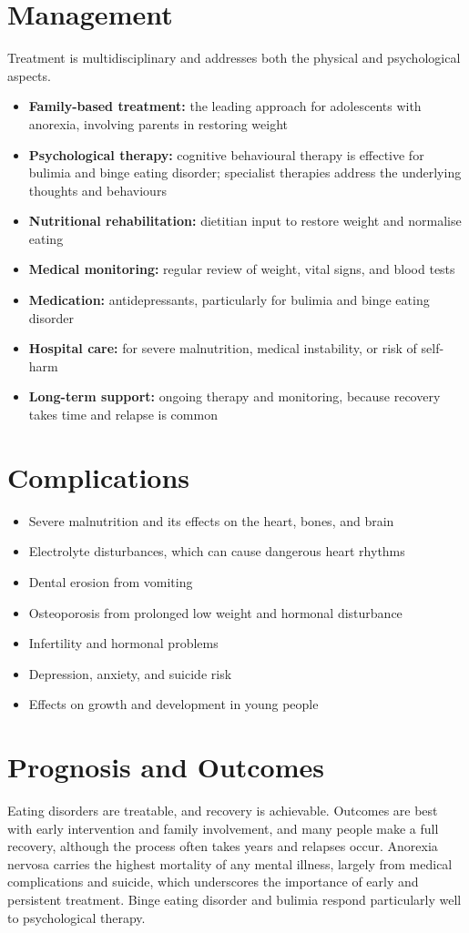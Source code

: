 \section*{Management}
Treatment is multidisciplinary and addresses both the physical and psychological aspects.
\begin{itemize}
    \item \textbf{Family-based treatment:} the leading approach for adolescents with anorexia, involving parents in restoring weight
    \item \textbf{Psychological therapy:} cognitive behavioural therapy is effective for bulimia and binge eating disorder; specialist therapies address the underlying thoughts and behaviours
    \item \textbf{Nutritional rehabilitation:} dietitian input to restore weight and normalise eating
    \item \textbf{Medical monitoring:} regular review of weight, vital signs, and blood tests
    \item \textbf{Medication:} antidepressants, particularly for bulimia and binge eating disorder
    \item \textbf{Hospital care:} for severe malnutrition, medical instability, or risk of self-harm
    \item \textbf{Long-term support:} ongoing therapy and monitoring, because recovery takes time and relapse is common
\end{itemize}

\section*{Complications}
\begin{itemize}
    \item Severe malnutrition and its effects on the heart, bones, and brain
    \item Electrolyte disturbances, which can cause dangerous heart rhythms
    \item Dental erosion from vomiting
    \item Osteoporosis from prolonged low weight and hormonal disturbance
    \item Infertility and hormonal problems
    \item Depression, anxiety, and suicide risk
    \item Effects on growth and development in young people
\end{itemize}

\section*{Prognosis and Outcomes}
Eating disorders are treatable, and recovery is achievable. Outcomes are best with early intervention and family involvement, and many people make a full recovery, although the process often takes years and relapses occur. Anorexia nervosa carries the highest mortality of any mental illness, largely from medical complications and suicide, which underscores the importance of early and persistent treatment. Binge eating disorder and bulimia respond particularly well to psychological therapy.

